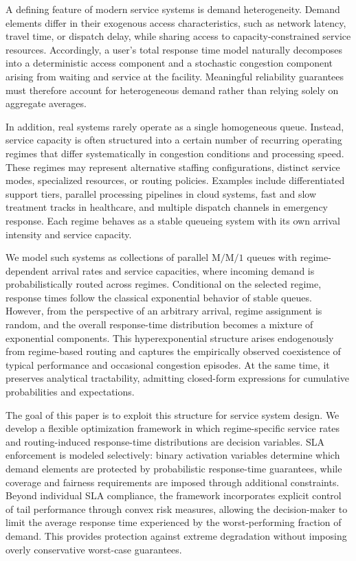 \documentclass[letter,11pt, reqno]{amsart}
\begin{document}
A defining feature of modern service systems is demand heterogeneity.
Demand elements differ in their exogenous access characteristics, such as
network latency, travel time, or dispatch delay, while sharing access to
capacity-constrained service resources.
Accordingly, a user’s total response time model naturally decomposes into a
deterministic access component and a stochastic congestion component arising
from waiting and service at the facility.
Meaningful reliability guarantees must therefore account for heterogeneous
demand rather than relying solely on aggregate averages.

In addition, real systems rarely operate as a single homogeneous queue.
Instead, service capacity is often structured into a certain number of recurring
operating regimes that differ systematically in congestion conditions and
processing speed.
These regimes may represent alternative staffing configurations, distinct
service modes, specialized resources, or routing policies.
Examples include differentiated support tiers, parallel processing pipelines
in cloud systems, fast and slow treatment tracks in healthcare, and multiple
dispatch channels in emergency response.
Each regime behaves as a stable queueing system with its own arrival intensity
and service capacity.

We model such systems as collections of parallel
$\mathrm{M}/\mathrm{M}/1$ queues with regime-dependent arrival rates and
service capacities, where incoming demand is probabilistically routed across
regimes.
Conditional on the selected regime, response times follow the classical
exponential behavior of stable queues. However,
from the perspective of an arbitrary arrival, regime assignment is
random, and the overall response-time distribution becomes a mixture of
exponential components.
This hyperexponential structure arises endogenously from regime-based routing
and captures the empirically observed coexistence of typical performance and
occasional congestion episodes.
At the same time, it preserves analytical tractability, admitting closed-form
expressions for cumulative probabilities and expectations.

The goal of this paper is to exploit this structure for service system design.
We develop a flexible optimization framework in which regime-specific service
rates and routing-induced response-time distributions are decision variables.
SLA enforcement is modeled selectively: binary activation variables determine
which demand elements are protected by probabilistic response-time guarantees,
while coverage and fairness requirements are imposed through additional
constraints.
Beyond individual SLA compliance, the framework incorporates explicit control
of tail performance through convex risk measures, allowing the decision-maker to
limit the average response time experienced by the worst-performing fraction
of demand.
This provides protection against extreme degradation without imposing overly
conservative worst-case guarantees.
\end{document}
